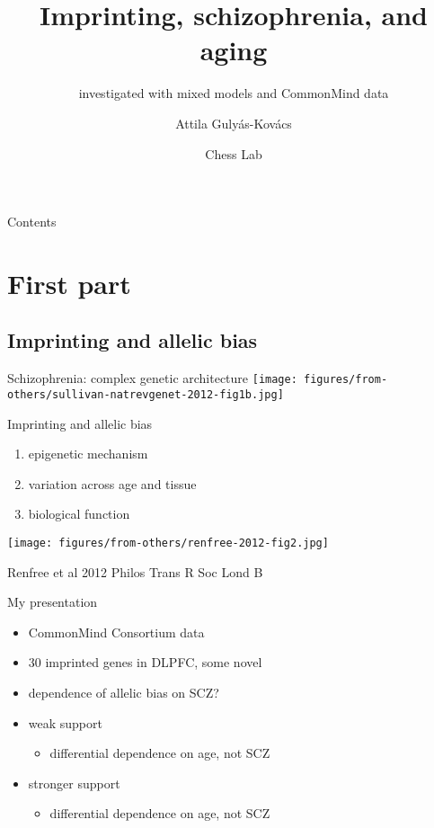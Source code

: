 \documentclass{beamer} %
\title{Imprinting, schizophrenia, and aging}
\subtitle{investigated with mixed models and CommonMind data}
\author{Attila Guly\'{a}s-Kov\'{a}cs}
\date{Chess Lab}
\begin{document}
\begin{frame}[plain, label=title]
\maketitle
\end{frame}

\begin{frame}{Contents}
\tableofcontents
\end{frame}

\section{First part}

\subsection{Imprinting and allelic bias}

\begin{frame}{Schizophrenia: complex genetic architecture}
\texttt{[image: figures/from-others/sullivan-natrevgenet-2012-fig1b.jpg]}
\end{frame}

\begin{frame}{Imprinting and allelic bias}
\begin{enumerate}
\item epigenetic mechanism
\item variation across age and tissue
\item biological function 
\end{enumerate}
\texttt{[image: figures/from-others/renfree-2012-fig2.jpg]}

{\tiny Renfree et al 2012 Philos Trans R Soc Lond B}

\end{frame}

\begin{frame}{My   presentation}
\begin{itemize}
\item<1> CommonMind Consortium data
\item<1> 30 imprinted genes in DLPFC, some novel
\item<1> dependence of allelic bias on SCZ? 
\item<1> weak support
\begin{itemize}
\item  differential dependence on age, \alert{not} SCZ
\end{itemize}
\item<2> stronger support
\begin{itemize}
\item  differential dependence on age, \alert{not} SCZ
\end{itemize}
\end{itemize}
\end{frame}
\end{document}
